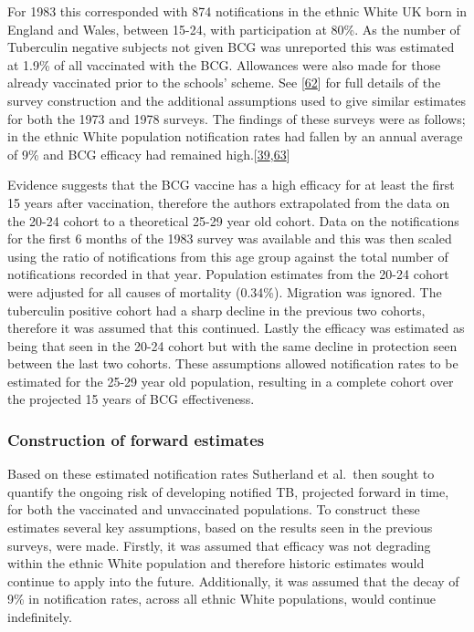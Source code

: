 \documentclass[11pt,twoside]{bristolthesis}
\begin{document}
  For 1983 this corresponded with 874 notifications in the ethnic White UK born in England and Wales, between 15-24, with participation at 80\%. As the number of Tuberculin negative subjects not given BCG was unreported this was estimated at 1.9\% of all vaccinated with the BCG. Allowances were also made for those already vaccinated prior to the schools' scheme. See {[}\protect\hyperlink{ref-Sutherland1987a}{62}{]} for full details of the survey construction and the additional assumptions used to give similar estimates for both the 1973 and 1978 surveys. The findings of these surveys were as follows; in the ethnic White population notification rates had fallen by an annual average of 9\% and BCG efficacy had remained high.{[}\protect\hyperlink{ref-Sutherland1989}{39},\protect\hyperlink{ref-Springett1988}{63}{]}
  
  Evidence suggests that the BCG vaccine has a high efficacy for at least the first 15 years after vaccination, therefore the authors extrapolated from the data on the 20-24 cohort to a theoretical 25-29 year old cohort. Data on the notifications for the first 6 months of the 1983 survey was available and this was then scaled using the ratio of notifications from this age group against the total number of notifications recorded in that year. Population estimates from the 20-24 cohort were adjusted for all causes of mortality (0.34\%). Migration was ignored. The tuberculin positive cohort had a sharp decline in the previous two cohorts, therefore it was assumed that this continued. Lastly the efficacy was estimated as being that seen in the 20-24 cohort but with the same decline in protection seen between the last two cohorts. These assumptions allowed notification rates to be estimated for the 25-29 year old population, resulting in a complete cohort over the projected 15 years of BCG effectiveness.
  
  \hypertarget{construction-of-forward-estimates}{%
  \subsubsection{Construction of forward estimates}\label{construction-of-forward-estimates}}
  
  Based on these estimated notification rates Sutherland et al.~then sought to quantify the ongoing risk of developing notified TB, projected forward in time, for both the vaccinated and unvaccinated populations. To construct these estimates several key assumptions, based on the results seen in the previous surveys, were made. Firstly, it was assumed that efficacy was not degrading within the ethnic White population and therefore historic estimates would continue to apply into the future. Additionally, it was assumed that the decay of 9\% in notification rates, across all ethnic White populations, would continue indefinitely.
  
\end{document}
